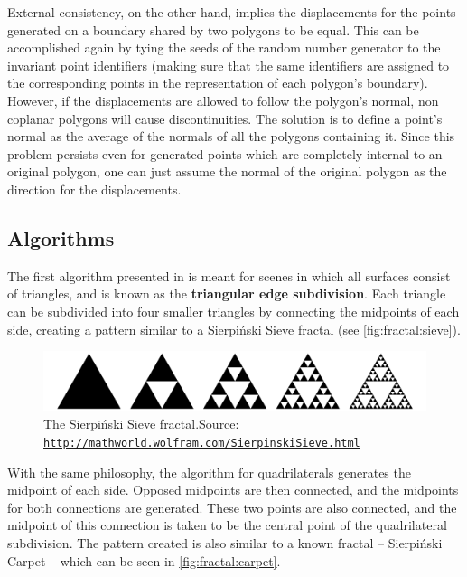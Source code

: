 \documentclass{acmtog}
\begin{document}
External consistency, on the other hand, implies the displacements for the points generated on a boundary shared by two polygons to be equal. This can be accomplished again by tying the seeds of the random number generator to the invariant point identifiers (making sure that the same identifiers are assigned to the corresponding points in the representation of each polygon's boundary). However, if the displacements are allowed to follow the polygon's normal, non coplanar polygons will cause discontinuities. The solution is to define a point's normal as the average of the normals of all the polygons containing it. Since this problem persists even for generated points which are completely internal to an original polygon, one can just assume the normal of the original polygon as the direction for the displacements.

\subsection{Algorithms}
The first algorithm presented in \cite{Fournier82} is meant for scenes in which all surfaces consist of triangles, and is known as the \textbf{triangular edge subdivision}. Each triangle can be subdivided into four smaller triangles by connecting the midpoints of each side, creating a pattern similar to a Sierpiński Sieve fractal (see \autoref{fig:fractal:sieve}). 

\begin{figure}[!htp]
	\begin{center}
		\includegraphics[width=\columnwidth]{images/fractals/sieve.png}
	\end{center}
	\caption{The Sierpiński Sieve fractal.\newline Source: \texttt{\url{http://mathworld.wolfram.com/SierpinskiSieve.html}}}
	\label{fig:fractal:sieve}
\end{figure}

With the same philosophy, the algorithm for quadrilaterals generates the midpoint of each side. Opposed midpoints are then connected, and the midpoints for both connections are generated. These two points are also connected, and the midpoint of this connection is taken to be the central point of the quadrilateral subdivision. The pattern created is also similar to a known fractal -- Sierpiński Carpet -- which can be seen in \autoref{fig:fractal:carpet}.
\end{document}
